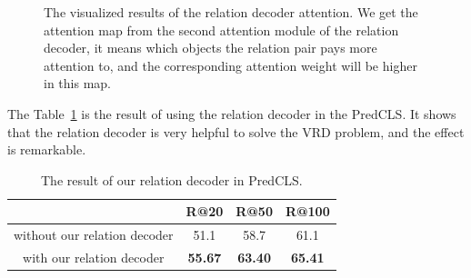 \begin{figure}[!htp]
{\begin{minipage}[t]{5cm}
		\end{minipage}}
	
	\caption[The visualized results of the relation decoder attention.]{The visualized results of the relation decoder attention. We get the attention map from the second attention module of the relation decoder, it means which objects the relation pair pays more attention to, and the corresponding  attention weight will be higher in this map.}
	\label{fig:relation_attetnion}
\end{figure}

The Table~\ref{tab:result_relation_decoder} is the result of using the relation decoder in the PredCLS. It shows that the relation decoder is very helpful to solve the VRD problem, and the effect is remarkable.

\begin{table}[!h]
	\centering
	\begin{tabular}{c|ccc}
		\bottomrule
		& R@20    & R@50    & R@100      \\ \hline
		without our relation decoder  & 51.1    &58.7      & 61.1    \\
		with our relation decoder      & \textbf{55.67} & \textbf{63.40} & \textbf{65.41}     \\ \bottomrule
	\end{tabular}
	
	\caption[The result of our relation decoder in PredCLS]{The result of our relation decoder in PredCLS.}
	\label{tab:result_relation_decoder}
\end{table}

